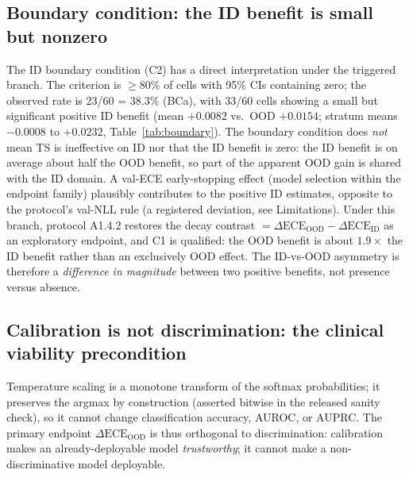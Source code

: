\documentclass[review,12pt,nonatbib]{elsarticle}
\begin{document}
\subsection{Boundary condition: the ID benefit is small but nonzero}
The ID boundary condition (C2) has a direct interpretation under the
triggered branch. The criterion is $\geq$80\% of cells with 95\% CIs
containing zero; the observed rate is 23/60 = 38.3\% (BCa), with
33/60 cells showing a small but significant positive ID benefit
(mean $+0.0082$ vs.\ OOD $+0.0154$; stratum means $-0.0008$ to
$+0.0232$, Table~\ref{tab:boundary}). The boundary condition does
\emph{not} mean TS is ineffective on ID nor that the ID benefit is
zero: the ID benefit is on average about half the OOD benefit, so
part of the apparent OOD gain is shared with the ID domain. A val-ECE
early-stopping effect (model selection within the endpoint family)
plausibly contributes to the positive ID estimates, opposite to the
protocol's val-NLL rule (a registered deviation, see Limitations).
Under this branch, protocol A1.4.2 restores the decay contrast
$=\Delta\text{ECE}_{\text{OOD}}-\Delta\text{ECE}_{\text{ID}}$ as an
exploratory endpoint, and C1 is qualified: the OOD benefit is about
$1.9\times$ the ID benefit rather than an exclusively OOD effect. The
ID-vs-OOD asymmetry is therefore a \emph{difference in magnitude}
between two positive benefits, not presence versus absence.

\subsection{Calibration is not discrimination: the clinical viability precondition}
Temperature scaling is a monotone transform of the softmax
probabilities; it preserves the argmax by construction (asserted
bitwise in the released sanity check), so it cannot change
classification accuracy, AUROC, or AUPRC. The primary endpoint
$\Delta\text{ECE}_{\text{OOD}}$ is thus orthogonal to discrimination:
calibration makes an already-deployable model \emph{trustworthy}; it
cannot make a non-discriminative model deployable.
\end{document}
